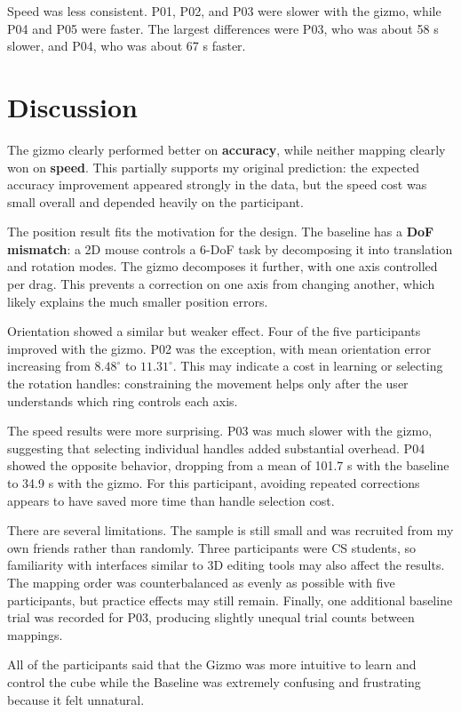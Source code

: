 \documentclass[11pt]{article}
\begin{document}
Speed was less consistent. P01, P02, and P03 were slower with the gizmo,
while P04 and P05 were faster. The largest differences were P03, who was
about 58 s slower, and P04, who was about 67 s faster.

\section{Discussion}

The gizmo clearly performed better on \textbf{accuracy}, while neither
mapping clearly won on \textbf{speed}. This partially supports my original
prediction: the expected accuracy improvement appeared strongly in the
data, but the speed cost was small overall and depended heavily on the
participant.

The position result fits the motivation for the design. The baseline has a
\textbf{DoF mismatch}: a 2D mouse controls a 6-DoF task by decomposing it
into translation and rotation modes. The gizmo decomposes it further, with
one axis controlled per drag. This prevents a correction on one axis from
changing another, which likely explains the much smaller position errors.

Orientation showed a similar but weaker effect. Four of the five
participants improved with the gizmo. P02 was the exception, with mean
orientation error increasing from $8.48^\circ$ to $11.31^\circ$. This may
indicate a cost in learning or selecting the rotation handles: constraining
the movement helps only after the user understands which ring controls each
axis.

The speed results were more surprising. P03 was much slower with the gizmo,
suggesting that selecting individual handles added substantial overhead.
P04 showed the opposite behavior, dropping from a mean of 101.7 s with the
baseline to 34.9 s with the gizmo. For this participant, avoiding repeated
corrections appears to have saved more time than handle selection cost.

There are several limitations. The sample is still small and was recruited
from my own friends rather than randomly. Three participants were CS
students, so familiarity with interfaces similar to 3D editing tools may
also affect the results. The mapping order was counterbalanced as evenly as
possible with five participants, but practice effects may still remain.
Finally, one additional baseline trial was recorded for P03, producing
slightly unequal trial counts between mappings.

All of the participants said that the Gizmo was more intuitive to learn and
control the cube while the Baseline was extremely confusing and frustrating because
it felt unnatural.
\end{document}

